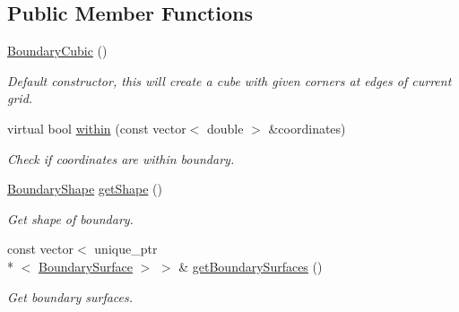 \subsection*{Public Member Functions}
\begin{DoxyCompactItemize}
\item 
\hyperlink{classBoundaryCubic_abba330bb75d623c8fa0884eeea937e63}{Boundary\+Cubic} ()
\begin{DoxyCompactList}\small\item\em Default constructor, this will create a cube with given corners at edges of current grid. \end{DoxyCompactList}\item 
virtual bool \hyperlink{classBoundaryCubic_a07b7fc5d0d09b0ce39e92e6b4bd2a7a4}{within} (const vector$<$ double $>$ \&coordinates)
\begin{DoxyCompactList}\small\item\em Check if coordinates are within boundary. \end{DoxyCompactList}\item 
\hyperlink{Boundary_8h_a0099b369f2bc119c1b54728734b41132}{Boundary\+Shape} \hyperlink{classBoundary_a20d2121527b207eed35f6719393e3499}{get\+Shape} ()
\begin{DoxyCompactList}\small\item\em Get shape of boundary. \end{DoxyCompactList}\item 
const vector$<$ unique\+\_\+ptr\\*
$<$ \hyperlink{classBoundarySurface}{Boundary\+Surface} $>$ $>$ \& \hyperlink{classBoundary_acfa6640f65c432e339108887913539eb}{get\+Boundary\+Surfaces} ()
\begin{DoxyCompactList}\small\item\em Get boundary surfaces. \end{DoxyCompactList}\end{DoxyCompactItemize}
